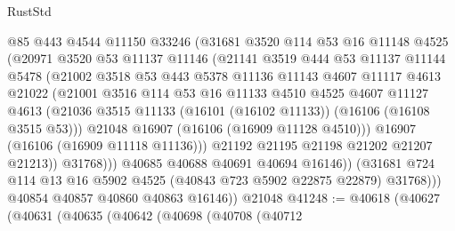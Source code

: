 \begin{lexlean}{RustStd}
\begin{coremodule}
                    @85
                    @443
                    @4544
                    @11150
                    @33246
                    (@31681
                      @3520
                      @114
                      @53
                      @16
                      @11148
                      @4525
                      (@20971
                        @3520
                        @53
                        @11137
                        @11146
                        (@21141
                          @3519
                          @444
                          @53
                          @11137
                          @11144
                          @5478
                          (@21002
                            @3518
                            @53
                            @443
                            @5378
                            @11136
                            @11143
                            @4607
                            @11117
                            @4613
                            @21022
                            (@21001
                              @3516
                              @114
                              @53
                              @16
                              @11133
                              @4510
                              @4525
                              @4607
                              @11127
                              @4613
                              (@21036
                                @3515
                                @11133
                                (@16101 (@16102 @11133))
                                (@16106 (@16108 @3515 @53)))
                              @21048
                              @16907
                              (@16106 (@16909 @11128 @4510)))
                            @16907
                            (@16106 (@16909 @11118 @11136)))
                          @21192
                          @21195
                          @21198
                          @21202
                          @21207
                          @21213))
                      @31768)))
                @40685
                @40688
                @40691
                @40694
                @16146))
            (@31681 @724 @114 @13 @16 @5902 @4525 (@40843 @723 @5902 @22875 @22879) @31768)))
        @40854
        @40857
        @40860
        @40863
        @16146))
    @21048
@41248 := @40618
    (@40627
      (@40631
        (@40635
          (@40642
            (@40698
              (@40708
                (@40712

\end{coremodule}
\end{lexlean}
